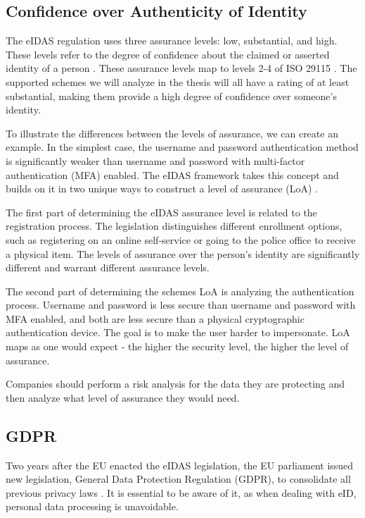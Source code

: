 \subsection{Confidence over Authenticity of Identity}

The eIDAS regulation uses three assurance levels: low, substantial, and high. These levels refer to the degree of confidence about the claimed or asserted identity of a person \cite{eulaw-eidas}. These assurance levels map to levels 2-4 of ISO 29115 \cite{iso29115}. The supported schemes we will analyze in the thesis will all have a rating of at least substantial, making them provide a high degree of confidence over someone's identity.

To illustrate the differences between the levels of assurance, we can create an example. In the simplest case, the {username and password} authentication method is significantly weaker than {username and password} with multi-factor authentication (MFA) enabled. The eIDAS framework takes this concept and builds on it in two unique ways to construct a level of assurance (LoA) \cite{eulaw-eidas-loa}.

The first part of determining the eIDAS assurance level is related to the registration process. The legislation distinguishes different enrollment options, such as registering on an online self-service or going to the police office to receive a physical item. The levels of assurance over the person's identity are significantly different and warrant different assurance levels.

The second part of determining the schemes LoA is analyzing the authentication process. {Username and password} is less secure than {username and password} with MFA enabled, and both are less secure than a physical cryptographic authentication device. The goal is to make the user harder to impersonate. LoA maps as one would expect - the higher the security level, the higher the level of assurance.

Companies should perform a risk analysis for the data they are protecting and then analyze what level of assurance they would need.

\subsection{GDPR}

Two years after the EU enacted the eIDAS legislation, the EU parliament issued new legislation, General Data Protection Regulation (GDPR), to consolidate all previous privacy laws \cite{eulaw-gdpr}. It is essential to be aware of it, as when dealing with eID, personal data processing is unavoidable.

